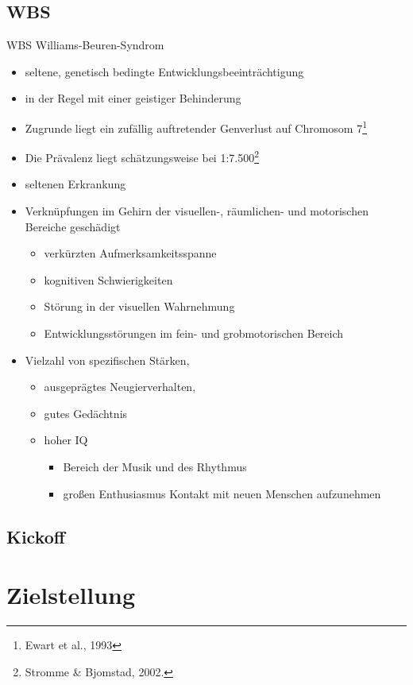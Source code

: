 \documentclass[10pt,fleqn]{beamer}
\begin{document}
\subsection{WBS}
	\begin{frame}[t]{WBS Williams-Beuren-Syndrom}
		\begin{itemize}
			\item seltene, genetisch bedingte Entwicklungsbeeinträchtigung
			\item in der Regel mit einer geistiger Behinderung
			\item Zugrunde liegt ein zufällig auftretender Genverlust auf Chromosom 7\footnote{Ewart et al., 1993} 
			\item Die Prävalenz liegt schätzungsweise bei 1:7.500\footnote{Stromme \& Bjomstad, 2002.}
			\item seltenen Erkrankung
			\item Verknüpfungen im Gehirn der visuellen-, räumlichen- und motorischen Bereiche geschädigt
			\begin{itemize}
				\item verkürzten Aufmerksamkeitsspanne
				\item kognitiven Schwierigkeiten
				\item Störung in der visuellen Wahrnehmung
				\item Entwicklungsstörungen im fein- und grobmotorischen Bereich
			\end{itemize}
			\item Vielzahl von spezifischen Stärken,
			\begin{itemize}
				\item ausgeprägtes Neugierverhalten,
				\item gutes Gedächtnis
				\item hoher IQ
				\begin{itemize}
					\item Bereich der Musik und des Rhythmus
					\item großen Enthusiasmus Kontakt mit neuen Menschen aufzunehmen
				\end{itemize} 
			\end{itemize} 
		\end{itemize}
	\end{frame}

\subsection{Kickoff}

\section{Zielstellung}
\end{document}
